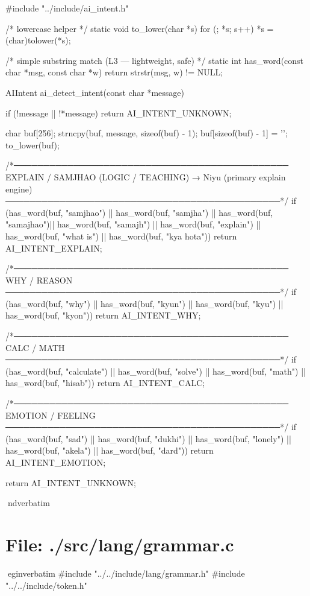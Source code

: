 \documentclass{article}
\begin{document}
#include "../include/ai_intent.h"

/* lowercase helper */
static void to_lower(char *s)
{
    for (; *s; s++)
        *s = (char)tolower(*s);
}

/* simple substring match (L3 — lightweight, safe) */
static int has_word(const char *msg, const char *w)
{
    return strstr(msg, w) != NULL;
}

AIIntent ai_detect_intent(const char *message)
{
    if (!message || !*message)
        return AI_INTENT_UNKNOWN;

    char buf[256];
    strncpy(buf, message, sizeof(buf) - 1);
    buf[sizeof(buf) - 1] = '\0';
    to_lower(buf);

    /*──────────────────────────────────────────────
      EXPLAIN / SAMJHAO (LOGIC / TEACHING)
      → Niyu (primary explain engine)
    ──────────────────────────────────────────────*/
    if (has_word(buf, "samjhao") ||
        has_word(buf, "samjha")  ||
        has_word(buf, "samajhao")||
        has_word(buf, "samajh")  ||
        has_word(buf, "explain") ||
        has_word(buf, "what is") ||
        has_word(buf, "kya hota"))
        return AI_INTENT_EXPLAIN;

    /*──────────────────────────────────────────────
      WHY / REASON
    ──────────────────────────────────────────────*/
    if (has_word(buf, "why")  ||
        has_word(buf, "kyun") ||
        has_word(buf, "kyu")  ||
        has_word(buf, "kyon"))
        return AI_INTENT_WHY;

    /*──────────────────────────────────────────────
      CALC / MATH
    ──────────────────────────────────────────────*/
    if (has_word(buf, "calculate") ||
        has_word(buf, "solve")     ||
        has_word(buf, "math")      ||
        has_word(buf, "hisab"))
        return AI_INTENT_CALC;

    /*──────────────────────────────────────────────
      EMOTION / FEELING
    ──────────────────────────────────────────────*/
    if (has_word(buf, "sad")    ||
        has_word(buf, "dukhi")  ||
        has_word(buf, "lonely") ||
        has_word(buf, "akela")  ||
        has_word(buf, "dard"))
        return AI_INTENT_EMOTION;

    return AI_INTENT_UNKNOWN;
}
nd{verbatim}
\section*{File: ./src/lang/grammar.c}
egin{verbatim}
#include "../../include/lang/grammar.h"
#include "../../include/token.h"
\end{document}
